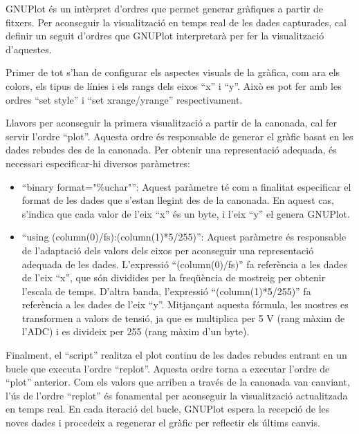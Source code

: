 \documentclass{tfgitic}[2023/06/30]
\begin{document}
GNUPlot és un intèrpret d'ordres que permet generar gràfiques a partir
de fitxers. Per aconseguir la visualització en temps real de les dades
capturades, cal definir un seguit d'ordres que GNUPlot interpretarà
per fer la visualització d'aquestes.

Primer de tot s'han de configurar els aspectes visuals de la gràfica,
com ara els colors, els tipus de línies i els rangs dels eixos ``x'' i
``y''. Això es pot fer amb les ordres ``set style'' i ``set
xrange/yrange'' respectivament.

Llavors per aconseguir la primera visualització a partir de la
canonada, cal fer servir l'ordre ``plot''. Aquesta ordre és
responsable de generar el gràfic basat en les dades rebudes des de la
canonada. Per obtenir una representació adequada, és necessari
especificar-hi diversos paràmetres:

\begin{itemize}
	\item ``binary format="\%uchar"'': Aquest paràmetre té com a
          finalitat especificar el format de les dades que s'estan
          llegint des de la canonada. En aquest cas, s'indica que cada
          valor de l'eix ``x'' és un byte, i l'eix ``y'' el genera
          GNUPlot.
	\item ``using (column(0)/fs):(column(1)*5/255)'': Aquest
          paràmetre és responsable de l'adaptació dels valors dels
          eixos per aconseguir una representació adequada de les
          dades. L'expressió ``(column(0)/fs)'' fa referència a les
          dades de l'eix ``x'', que són dividides per la freqüència de
          mostreig per obtenir l'escala de temps. D'altra banda,
          l'expressió ``(column(1)*5/255)'' fa referència a les dades
          de l'eix ``y''. Mitjançant aquesta fórmula, les mostres es
          transformen a valors de tensió, ja que es multiplica per 5 V
          (rang màxim de l'ADC) i es divideix per 255 (rang màxim d'un
          byte).
\end{itemize}

Finalment, el ``script'' realitza el plot continu de les dades rebudes
entrant en un bucle que executa l'ordre ``replot''. Aquesta ordre
torna a executar l'ordre de ``plot'' anterior. Com els valors que
arriben a través de la canonada van canviant, l'ús de l'ordre
``replot'' és fonamental per aconseguir la visualització actualitzada
en temps real. En cada iteració del bucle, GNUPlot espera la recepció
de les noves dades i procedeix a regenerar el gràfic per reflectir els
últims canvis.
\end{document}
